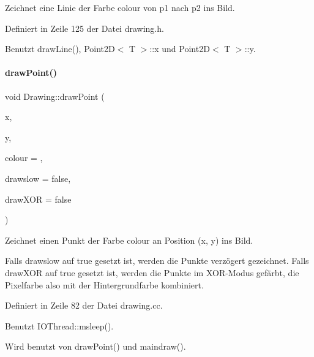Zeichnet eine Linie der Farbe {\ttfamily colour} von {\ttfamily p1} nach {\ttfamily p2} ins Bild. 



Definiert in Zeile 125 der Datei drawing.\+h.



Benutzt draw\+Line(), Point2\+D$<$ T $>$\+::x und Point2\+D$<$ T $>$\+::y.

\mbox{\label{classDrawing_a482d8231afa23d444084a30c94cd5252}} 
\paragraph{\texorpdfstring{draw\+Point()}{drawPoint()}\hspace{0.1cm}{\footnotesize\ttfamily [1/2]}}
{\footnotesize\ttfamily void Drawing\+::draw\+Point (\begin{DoxyParamCaption}\item[{int}]{x,  }\item[{int}]{y,  }\item[{\mbox{\hyperlink{classDrawColour}{Draw\+Colour}}}]{colour = {},  }\item[{bool}]{drawslow = {\ttfamily false},  }\item[{bool}]{draw\+X\+OR = {\ttfamily false} }\end{DoxyParamCaption})}



Zeichnet einen Punkt der Farbe {\ttfamily colour} an Position ({\ttfamily x}, {\ttfamily y}) ins Bild. 

Falls {\ttfamily drawslow} auf {\ttfamily true} gesetzt ist, werden die Punkte verzögert gezeichnet. Falls {\ttfamily draw\+X\+OR} auf {\ttfamily true} gesetzt ist, werden die Punkte im X\+O\+R-\/\+Modus gefärbt, die Pixelfarbe also mit der Hintergrundfarbe kombiniert. 

Definiert in Zeile 82 der Datei drawing.\+cc.



Benutzt I\+O\+Thread\+::msleep().



Wird benutzt von draw\+Point() und maindraw().

\mbox{\label{classDrawing_ace204fccbe188a6b9e8d524cc243f005}} 
